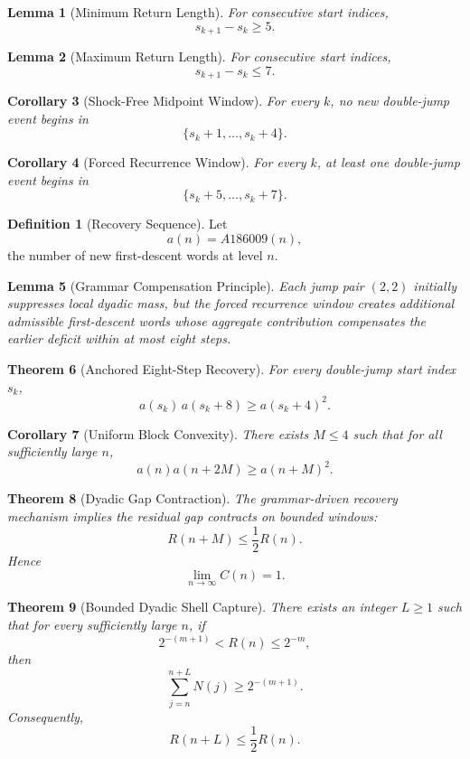 \documentclass[12pt, oneside]{article}
\numberwithin{equation}{section}
\theoremstyle{definition}
\newtheorem{definition}{Definition}[section]
\theoremstyle{plain}
\newtheorem{theorem}{Theorem}[section]
\newtheorem{lemma}[theorem]{Lemma}
\newtheorem{corollary}[theorem]{Corollary}
\theoremstyle{remark}
\begin{document}
\begin{lemma}[Minimum Return Length]
For consecutive start indices,
\[
s_{k+1}-s_k\ge5.
\]
\end{lemma}

\begin{lemma}[Maximum Return Length]
For consecutive start indices,
\[
s_{k+1}-s_k\le7.
\]
\end{lemma}

\begin{corollary}[Shock-Free Midpoint Window]
For every $k$, no new double-jump event begins in
\[
\{s_k+1,\dots,s_k+4\}.
\]
\end{corollary}

\begin{corollary}[Forced Recurrence Window]
For every $k$, at least one double-jump event begins in
\[
\{s_k+5,\dots,s_k+7\}.
\]
\end{corollary}

\begin{definition}[Recovery Sequence]
Let
\[
a(n)=A186009(n),
\]
the number of new first-descent words at level $n$.
\end{definition}

\begin{lemma}[Grammar Compensation Principle]
Each jump pair $(2,2)$ initially suppresses local dyadic mass,
but the forced recurrence window creates additional admissible
first-descent words whose aggregate contribution compensates
the earlier deficit within at most eight steps.
\end{lemma}

\begin{theorem}[Anchored Eight-Step Recovery]
For every double-jump start index $s_k$,
\[
a(s_k)\,a(s_k+8)\ge a(s_k+4)^2.
\]
\end{theorem}

\begin{corollary}[Uniform Block Convexity]
There exists $M\le4$ such that for all sufficiently large $n$,
\[
a(n)a(n+2M)\ge a(n+M)^2.
\]
\end{corollary}

\begin{theorem}[Dyadic Gap Contraction]
The grammar-driven recovery mechanism implies the residual gap
contracts on bounded windows:
\[
R(n+M)\le \frac12 R(n).
\]
Hence
\[
\lim_{n\to\infty}C(n)=1.
\]
\end{theorem}


\begin{theorem}[Bounded Dyadic Shell Capture]
There exists an integer $L\ge1$ such that for every sufficiently large $n$,
if
\[
2^{-(m+1)} < R(n)\le 2^{-m},
\]
then
\[
\sum_{j=n}^{n+L} N(j)\ge 2^{-(m+1)}.
\]
Consequently,
\[
R(n+L)\le \frac12 R(n).
\]
\end{theorem}
\end{document}
